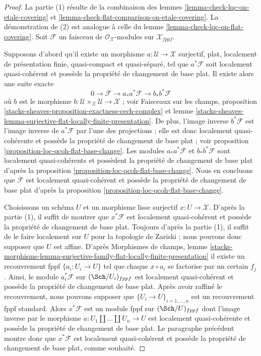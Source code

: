\begin{proof}
La partie (1) résulte de la combinaison des
lemmes \ref{lemma-check-lqc-on-etale-covering} et
\ref{lemma-check-flat-comparison-on-etale-covering}.
La démonstration de (2) est analogue à celle du
lemme \ref{lemma-check-lqc-on-flat-covering}.
Soit $\mathcal{F}$ un faisceau de $\mathcal{O}_\mathcal{X}$-modules
sur $\mathcal{X}_{fppf}$.

\medskip\noindent
Supposons d'abord qu'il existe un morphisme $a : \mathcal{U} \to \mathcal{X}$
surjectif, plat, localement de présentation finie, quasi-compact
et quasi-séparé, tel que $a^*\mathcal{F}$ soit localement quasi-cohérent
et possède la propriété de changement de base plat.
Il existe alors une suite exacte
$$
0 \to \mathcal{F} \to a_*a^*\mathcal{F} \to b_*b^*\mathcal{F}
$$
où $b$ est le morphisme
$b : \mathcal{U} \times_\mathcal{X} \mathcal{U} \to \mathcal{X}$ ; voir
Faisceaux sur les champs, proposition
\ref{stacks-sheaves-proposition-exactness-cech-complex} et
lemme \ref{stacks-sheaves-lemma-surjective-flat-locally-finite-presentation}.
De plus, l'image inverse $b^*\mathcal{F}$ est l'image inverse de $a^*\mathcal{F}$
par l'une des projections ; elle est donc localement quasi-cohérente
et possède la propriété de changement de base plat ; voir
proposition \ref{proposition-loc-qcoh-flat-base-change}.
Les modules $a_*a^*\mathcal{F}$ et $b_*b^*\mathcal{F}$ sont localement
quasi-cohérents et possèdent la propriété de changement de base plat d'après la
proposition \ref{proposition-loc-qcoh-flat-base-change}.
Nous en concluons que $\mathcal{F}$ est localement quasi-cohérent et
possède la propriété de changement de base plat d'après la
proposition \ref{proposition-loc-qcoh-flat-base-change}.

\medskip\noindent
Choisissons un schéma $U$ et un morphisme lisse surjectif $x : U \to \mathcal{X}$.
D'après la partie (1), il suffit de montrer que $x^*\mathcal{F}$ est localement
quasi-cohérent et possède la propriété de changement de base plat.
Toujours d'après la partie (1), il suffit de le faire localement sur $U$ pour la topologie de Zariski ;
nous pouvons donc supposer que $U$ est affine. D'après
Morphismes de champs, lemme
\ref{stacks-morphisms-lemma-surjective-family-flat-locally-finite-presentation}
il existe un recouvrement fppf $\{a_i : U_i \to U\}$ tel que
chaque $x \circ a_i$ se factorise par un certain $f_j$. Ainsi, le module
$a_i^*\mathcal{F}$ sur $(\Sch/U_i)_{fppf}$
est localement quasi-cohérent et possède la propriété de changement de base plat.
Après avoir raffiné le recouvrement, nous pouvons supposer que $\{U_i \to U\}_{i = 1, \ldots, n}$
est un recouvrement fppf standard. Alors $x^*\mathcal{F}$ est un
module fppf sur $(\Sch/U)_{fppf}$ dont l'image inverse par le morphisme
$a : U_1 \amalg \ldots \amalg U_n \to U$ est localement quasi-cohérente
et possède la propriété de changement de base plat.
Le paragraphe précédent montre donc que $x^*\mathcal{F}$ est localement
quasi-cohérent et possède la propriété de changement de base plat, comme souhaité.
\end{proof}

